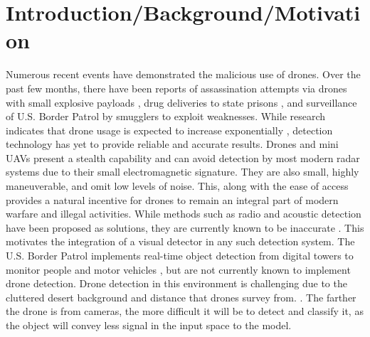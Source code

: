 \documentclass[10pt,twocolumn,letterpaper]{article}
\begin{document}
\section{Introduction/Background/Motivation}
Numerous recent events have demonstrated the malicious use of drones. Over the past few months, there have been reports of assassination attempts via drones with small explosive payloads \cite{SuicideDrone}, drug deliveries to state prisons \cite{PrisonDrugs}, and surveillance of U.S. Border Patrol by smugglers \cite{BorderPatrol} to exploit weaknesses. While research indicates that drone usage is expected to increase exponentially \cite{DroneMarket}, detection technology has yet to provide reliable and accurate results. Drones and mini UAVs present a stealth capability and can avoid detection by most modern radar systems due to their small electromagnetic signature. They are also small, highly maneuverable, and omit low levels of noise. This, along with the ease of access provides a natural incentive for drones to remain an integral part of modern warfare and illegal activities. While methods such as radio and acoustic detection have been proposed as solutions, they are currently known to be inaccurate \cite{Drone-Detection-Using-YOLOv5}. This motivates the integration of a visual detector in any such detection system. The U.S. Border Patrol implements real-time object detection from digital towers to monitor people and motor vehicles \cite{BorderDetection}, but are not currently known to implement drone detection. Drone detection in this environment is challenging due to the cluttered desert background and distance that drones survey from. \cite{BorderDigitalTowers}. The farther the drone is from cameras, the more difficult it will be to detect and classify it, as the object will convey less signal in the input space to the model.\\
\end{document}
